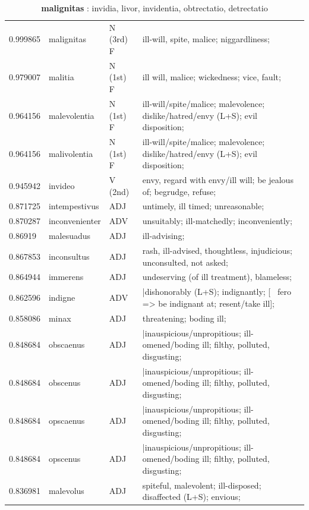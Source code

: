 \documentclass[]{article}
\begin{document}
	\begin{table}
	\caption{\textbf{malignitas} : invidia, livor, invidentia, obtrectatio, detrectatio \label{malignitas}}
	\vspace{.25in}
	\begin{tabular}{l|lll}
	   0.999865 & malignitas & N (3rd) F & ill-will, spite, malice; niggardliness;\\
	   0.979007 & malitia & N (1st) F & ill will, malice; wickedness; vice, fault;\\
	   0.964156 & malevolentia & N (1st) F & ill-will/spite/malice; malevolence; dislike/hatred/envy (L+S); evil disposition;\\
	   0.964156 & malivolentia & N (1st) F & ill-will/spite/malice; malevolence; dislike/hatred/envy (L+S); evil disposition;\\
	   0.945942 & invideo & V (2nd) & envy, regard with envy/ill will; be jealous of; begrudge, refuse;\\
	   0.871725 & intempestivus & ADJ & untimely, ill timed; unreasonable;\\
	   0.870287 & inconvenienter & ADV & unsuitably; ill-matchedly; inconveniently;\\
	   0.86919 & malesuadus & ADJ & ill-advising;\\
	   0.867853 & inconsultus & ADJ & rash, ill-advised, thoughtless, injudicious; unconsulted, not asked;\\
	   0.864944 & immerens & ADJ & undeserving (of ill treatment), blameless;\\
	   0.862596 & indigne & ADV & |dishonorably (L+S); indignantly; [~ fero => be indignant at; resent/take ill];\\
	   0.858086 & minax & ADJ & threatening; boding ill;\\
	   0.848684 & obscaenus & ADJ & |inauspicious/unpropitious; ill-omened/boding ill; filthy, polluted, disgusting;\\
	   0.848684 & obscenus & ADJ & |inauspicious/unpropitious; ill-omened/boding ill; filthy, polluted, disgusting;\\
	   0.848684 & opscaenus & ADJ & |inauspicious/unpropitious; ill-omened/boding ill; filthy, polluted, disgusting;\\
	   0.848684 & opscenus & ADJ & |inauspicious/unpropitious; ill-omened/boding ill; filthy, polluted, disgusting;\\
	   0.836981 & malevolus & ADJ & spiteful, malevolent; ill-disposed; disaffected (L+S); envious;\\

\end{tabular}
\end{table}
\end{document}
